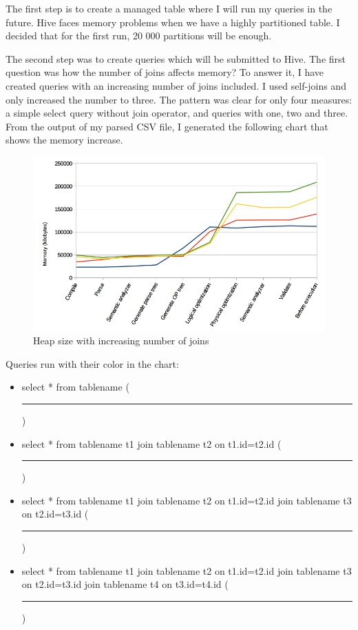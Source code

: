 The first step is to create a managed table where I will run my queries in the future. Hive faces memory problems when we have a highly partitioned table. I decided that for the first run, 20 000 partitions will be enough. 

The second step was to create queries which will be submitted to Hive. The first question was how the number of joins affects memory? To answer it, I have created queries with an increasing number of joins included. I used self-joins and only increased the number to three. The pattern was clear for only four measures: a simple select query without join operator, and queries with one, two and three. From the output of my parsed CSV file, I generated the following chart that shows the memory increase.

\begin{figure}[H]
	\includegraphics[width=150mm, keepaspectratio]{figures/hs2_joins_memory.png}
	\centering
	\caption{Heap size with increasing number of joins}
\end{figure}

\noindent Queries run with their color in the chart:
\begin{itemize}
	\item select * from tablename (\textcolor{blue}{\rule{2 cm}{2pt} })
	\item select * from tablename t1 join tablename t2 on t1.id=t2.id (\textcolor{orange}{\rule{2 cm}{2pt} })
	\item select * from tablename t1 join tablename t2 on t1.id=t2.id join tablename t3 on t2.id=t3.id (\textcolor{yellow}{\rule{2 cm}{2pt} })
	\item select * from tablename t1 join tablename t2 on t1.id=t2.id join tablename t3 on t2.id=t3.id join tablename t4 on t3.id=t4.id (\textcolor{green}{\rule{2 cm}{2pt} })
\end{itemize}


